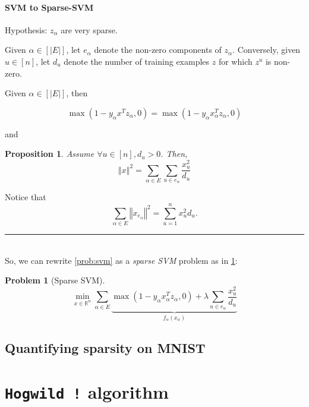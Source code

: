 \documentclass[twoside,11pt]{article}
\newcommand{\norm}[1]{\left\Vert #1 \right\Vert}
\newcommand{\todo}[1]{\textbf{\color{red}{[TODO: #1]}}}
\newcommand{\BlackBox}{\rule{1.5ex}{1.5ex}}  %
\renewenvironment{proof}{\par\noindent{\bf Proof\ }}{\hfill\BlackBox\\[2mm]}
\newtheorem{proposition}[theorem]{Proposition}
\newtheorem{problem}{Problem}
\begin{document}
\paragraph{SVM to Sparse-SVM}

Hypothesis: $z_\alpha$ are very sparse.

Given $\alpha \in [\vert E \vert]$, let $e_\alpha$ denote the non-zero components of $z_\alpha$. Conversely, given $u\in[n]$, let $d_u$ denote the number of training examples $z$ for which $z^u$ is non-zero.

Given $\alpha \in [\vert E\vert]$, then 

\begin{equation}
    \max(1- y_\alpha x^Tz_\alpha, 0) = \max(1- y_\alpha x_\alpha^Tz_\alpha, 0)
\end{equation}

and

\begin{proposition}
    Assume $\forall u \in[n], d_u > 0$. Then,
    \begin{equation}
        \norm{x}^2 = \sum_{\alpha \in E}\sum_{u\in e_\alpha}\frac{x_u^2}{d_u}
    \end{equation}
\end{proposition}

\begin{proof}
    Notice that
    \begin{equation*}
        \sum_{\alpha \in E} \norm{x_{e_\alpha}}^2 = \sum_{u=1}^n x_u^2d_u.
    \end{equation*}
\end{proof}
So, we can rewrite \cref{prob:svm} as a \emph{sparse SVM} problem as in \cref{prob:sparse-svm}:
\begin{problem}[Sparse SVM]\label{prob:sparse-svm}
    \begin{equation*}
        \min_{x\in\mathbb R^n}\sum_{\alpha \in E}\underbrace{\max(1- y_\alpha x_\alpha^Tz_\alpha, 0) + \lambda\sum_{u\in e_\alpha}\frac{x_u^2}{d_u}}_\text{$f_\alpha(x_\alpha)$}
    \end{equation*}
\end{problem}

\subsection{Quantifying sparsity on MNIST}
\todo{Define $\Omega$, $\Delta$ and $\rho$.}

\section{\texttt{Hogwild !} algorithm}
\end{document}
